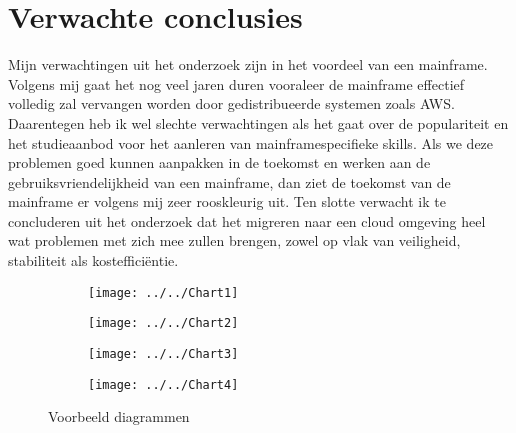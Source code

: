\section{Verwachte conclusies}
\label{sec:verwachte_conclusies}
Mijn verwachtingen uit het onderzoek zijn in het voordeel van een mainframe. Volgens mij gaat het nog veel jaren duren vooraleer de mainframe effectief volledig zal vervangen worden door gedistribueerde systemen zoals AWS. Daarentegen heb ik wel slechte verwachtingen als het gaat over de populariteit en het studieaanbod voor het aanleren van mainframespecifieke skills. Als we deze problemen goed kunnen aanpakken in de toekomst en werken aan de gebruiksvriendelijkheid van een mainframe, dan ziet de toekomst van de mainframe er volgens mij zeer rooskleurig uit. Ten slotte verwacht ik te concluderen uit het onderzoek dat het migreren naar een cloud omgeving heel wat problemen met zich mee zullen brengen, zowel op vlak van veiligheid, stabiliteit als kostefficiëntie. 
\begin{figure}
    \centering
    \begin{subfigure}{0.3\textwidth}
    \centering
    \texttt{[image: ../../Chart1]}
    \caption{}
    \label{fig:chart1}
    \end{subfigure}
    \hfill
    \begin{subfigure}{0.3\textwidth}
        \centering
        \texttt{[image: ../../Chart2]}
        \caption{}
        \label{fig:chart2}
    \end{subfigure}
    \hfill
    \begin{subfigure}{0.3\textwidth}
        \centering
        \texttt{[image: ../../Chart3]}
        \caption{}
        \label{fig:chart3}
    \end{subfigure}
    \hfill
    \begin{subfigure}{0.3\textwidth}
        \centering
        \texttt{[image: ../../Chart4]}
        \caption{}
        \label{fig:chart4}
    \end{subfigure}
\caption{Voorbeeld diagrammen}
\end{figure}




